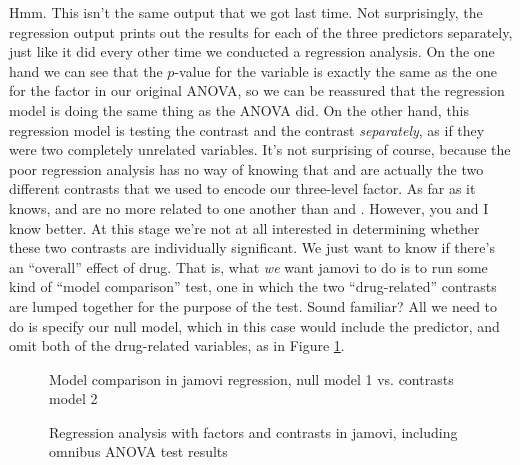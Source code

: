 Hmm. This isn't the same output that we got last time. Not surprisingly, the regression output prints out the results for each of the three predictors separately, just like it did every other time we conducted a regression analysis. On the one hand we can see that the $p$-value for the  variable is exactly the same as the one for the  factor in our original ANOVA, so we can be reassured that the regression model is doing the same thing as the ANOVA did. On the other hand, this regression model is testing the  contrast and the  contrast {\it separately}, as if they were two completely unrelated variables. It's not surprising of course, because the poor regression analysis has no way of knowing that  and  are actually the two different contrasts that we used to encode our three-level  factor. As far as it knows,  and  are no more related to one another than  and . However, you and I know better. At this stage we're not at all interested in determining whether these two contrasts are individually significant. We just want to know if there's an ``overall'' effect of drug. That is, what {\it we} want jamovi to do is to run some kind of ``model comparison'' test, one in which the two ``drug-related'' contrasts are lumped together for the purpose of the test. Sound familiar? All we need to do is specify our null model, which in this case would include the  predictor, and omit both of the drug-related variables, as in Figure \ref{fig:factorialanova11}. 

\begin{figure}[p]
\begin{center}
\caption{Model comparison in jamovi regression, null model 1 vs. contrasts model 2}
\label{fig:factorialanova11}
\HR
\end{center}
\end{figure}

\begin{figure}[p]
\begin{center}
\caption{Regression analysis with factors and contrasts in jamovi, including omnibus ANOVA test results}
\label{fig:regfactors}
\HR
\end{center}
\end{figure}

